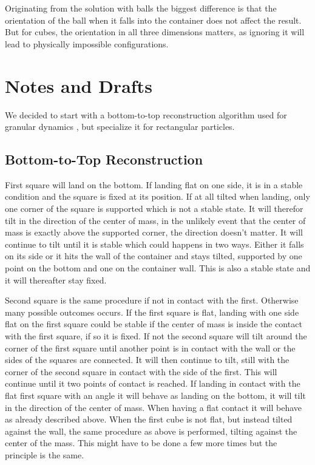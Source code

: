 \documentclass[draft, 12pt, sumlimits, intlimits]{article}
\begin{document}
Originating from the solution with balls the biggest difference is that the orientation of the ball when it falls into the container does not affect the result. But for cubes, the orientation in all three dimensions matters, as ignoring it will lead to physically impossible configurations.

\section{Notes and Drafts}

We decided to start with a bottom-to-top reconstruction algorithm used
for granular dynamics \cite{poschel-2005},
but specialize it for rectangular particles.

\subsection{Bottom-to-Top Reconstruction}
First square will land on the bottom. If landing flat on one side, it is in a stable condition and the square is fixed at its position. If at all tilted when landing, only one corner of the square is supported which is not a stable state. It will therefor tilt in the direction of the center of mass, in the unlikely event that the center of mass is exactly above the supported corner, the direction doesn't matter. It will continue to tilt until it is stable which could happens in two ways. Either it falls on its side or it hits the wall of the container and stays tilted, supported by one point on the bottom and one on the container wall. This is also a stable state and it will thereafter stay fixed.

Second square is the same procedure if not in contact with the first. Otherwise many possible outcomes occurs. If the first square is flat, landing with one side flat on the first square could be stable if the center of mass is inside the contact with the first square, if so it is fixed. If not the second square will tilt around the corner of the first square until another point is in contact with the wall or the sides of the squares are connected. It will then continue to tilt, still with the corner of the second square in contact with the side of the first. This will continue until it two points of contact is reached.
If landing in contact with the flat first square with an angle it will behave as landing on the bottom, it will tilt in the direction of the center of mass. When having a flat contact it will behave as already described above.
When the first cube is not flat, but instead tilted against the wall, the same procedure as above is performed, tilting against the center of the mass. This might have to be done a few more times but the principle is the same.
\end{document}

